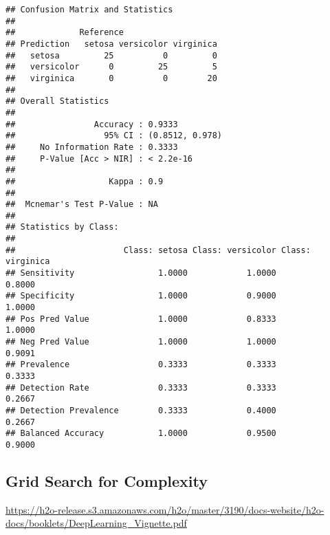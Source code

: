 \documentclass[
]{book}
\begin{document}
\begin{verbatim}
## Confusion Matrix and Statistics
## 
##             Reference
## Prediction   setosa versicolor virginica
##   setosa         25          0         0
##   versicolor      0         25         5
##   virginica       0          0        20
## 
## Overall Statistics
##                                          
##                Accuracy : 0.9333         
##                  95% CI : (0.8512, 0.978)
##     No Information Rate : 0.3333         
##     P-Value [Acc > NIR] : < 2.2e-16      
##                                          
##                   Kappa : 0.9            
##                                          
##  Mcnemar's Test P-Value : NA             
## 
## Statistics by Class:
## 
##                      Class: setosa Class: versicolor Class: virginica
## Sensitivity                 1.0000            1.0000           0.8000
## Specificity                 1.0000            0.9000           1.0000
## Pos Pred Value              1.0000            0.8333           1.0000
## Neg Pred Value              1.0000            1.0000           0.9091
## Prevalence                  0.3333            0.3333           0.3333
## Detection Rate              0.3333            0.3333           0.2667
## Detection Prevalence        0.3333            0.4000           0.2667
## Balanced Accuracy           1.0000            0.9500           0.9000
\end{verbatim}

\hypertarget{grid-search-for-complexity}{%
\subsection{Grid Search for Complexity}\label{grid-search-for-complexity}}

\url{https://h2o-release.s3.amazonaws.com/h2o/master/3190/docs-website/h2o-docs/booklets/DeepLearning_Vignette.pdf}
\end{document}
